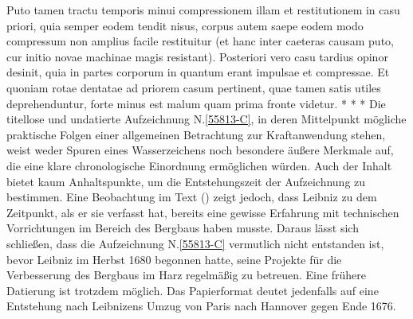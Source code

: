 \pstart%
Puto tamen tractu temporis%
minui compressionem illam%
et restitutionem%
%
in casu priori,
quia semper eodem tendit nisus,%
corpus autem saepe eodem modo compressum%
%
non amplius facile restituitur%
%
(et hanc inter caeteras causam puto,%
cur initio novae machinae magis resistant).%
Posteriori vero casu
tardius opinor desinit,
quia in
partes corporum%
in quantum erant impulsae%
et compressae.%
Et quoniam rotae dentatae%
ad priorem casum pertinent,
quae tamen satis utiles deprehenduntur,
forte minus est malum
quam prima fronte videtur.
\pend%
\newpage%
\pstart%
\noindent%
\centering%
*     *     *
\pend%
\vspace{3.0em}%
%
\frenchspacing%
\footnotesize%
\pstart%
\noindent%
%
Die titellose und undatierte Aufzeichnung N.\;\ref{55813-C}, in deren Mittelpunkt mögliche praktische Folgen einer allgemeinen Betrachtung zur Kraftanwendung stehen, weist weder Spuren eines Wasserzeichens noch besondere äußere Merkmale auf, die eine klare chronologische Einordnung ermöglichen würden.
Auch der Inhalt bietet kaum Anhaltspunkte, um die Entstehungszeit der Aufzeichnung zu bestimmen.
Eine Beobachtung im Text () zeigt jedoch, dass Leibniz zu dem Zeitpunkt, als er sie verfasst hat, bereits eine gewisse Erfahrung mit technischen Vorrichtungen im Bereich des Bergbaus haben musste.
Daraus lässt sich schließen, dass die Aufzeichnung N.\;\ref{55813-C} vermutlich nicht entstanden ist, bevor Leibniz im Herbst 1680 begonnen hatte, seine Projekte für die Verbesserung des Bergbaus im Harz regelmäßig zu betreuen.
Eine frühere Datierung ist trotzdem möglich.
Das Papierformat deutet jedenfalls auf eine Entstehung nach Leibnizens Umzug von Paris nach Hannover gegen Ende 1676.
\pend%
%
\frenchspacing%
\normalsize%
\newpage%
